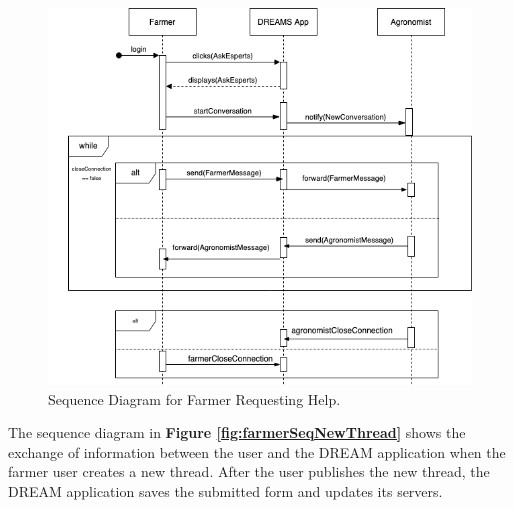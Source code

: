 \begin{figure}[hbt!]
\centering
\includegraphics[scale=0.6]{Files/sequence_disgrams/thePNGs/farmer_askExperts.png}
\caption{\label{fig:farmerSeqRequest}Sequence Diagram for Farmer Requesting Help.}
\end{figure}

%


\begin{flushleft}
The sequence diagram in \textbf{Figure \ref{fig:farmerSeqNewThread}} shows the exchange of information between the user and the DREAM application when the farmer user creates a new thread. After the user publishes the new thread, the DREAM application saves the submitted form and updates its servers.
\end{flushleft}

